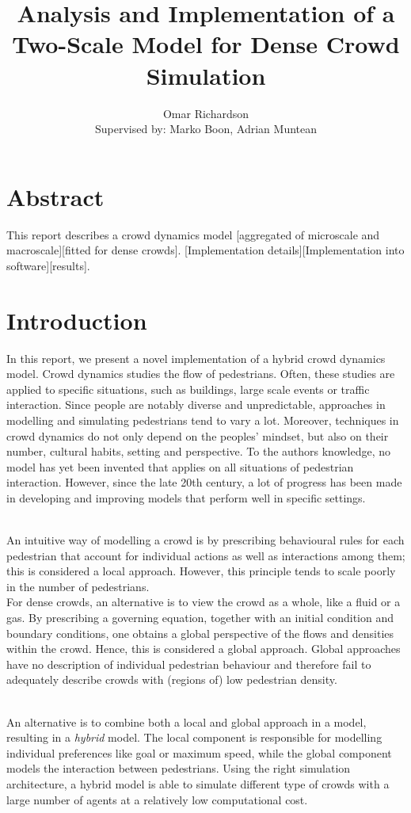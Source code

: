 \documentclass{article}
\title{Analysis and Implementation of a Two-Scale Model for Dense Crowd Simulation}
\author{Omar Richardson\\Supervised by: Marko Boon, Adrian Muntean}
\begin{document}
\maketitle
\section{Abstract}
This report describes a crowd dynamics model [aggregated of microscale and macroscale][fitted for dense crowds]. [Implementation details][Implementation into software][results].
\newpage
\section{Introduction}
In this report, we present a novel implementation of a hybrid crowd dynamics model. Crowd dynamics studies the flow of pedestrians. Often, these studies are applied to specific situations, such as buildings, large scale events or traffic interaction. 
Since people are notably diverse and unpredictable, approaches in modelling and simulating pedestrians tend to vary a lot. 
Moreover, techniques in crowd dynamics do not only depend on the peoples' mindset, but also on their number, cultural habits, setting and perspective. 
To the authors knowledge, no model has yet been invented that applies on all situations of pedestrian interaction. 
However, since the late 20th century, a lot of progress has been made in developing and improving models that perform well in specific settings. 

\ \\
An intuitive way of modelling a crowd is by prescribing behavioural rules for each pedestrian that account for individual actions as well as interactions among them; this is considered a local approach.
However, this principle tends to scale poorly in the number of pedestrians. 
\ \\
For dense crowds, an alternative is to view the crowd as a whole, like a fluid or a gas. 
By prescribing a governing equation, together with an initial condition and boundary conditions, one obtains a global perspective of the flows and densities within the crowd. Hence, this is considered a global approach.
Global approaches have no description of individual pedestrian behaviour and therefore fail to adequately describe crowds with (regions of) low pedestrian density.

\ \\
An alternative is to combine both a local and global approach in a model, resulting in a \emph{hybrid} model. The local component is responsible for modelling individual preferences like goal or maximum speed, while the global component models the interaction between pedestrians.
Using the right simulation architecture, a hybrid model is able to simulate different type of crowds with a large number of agents at a relatively low computational cost.
\end{document}

